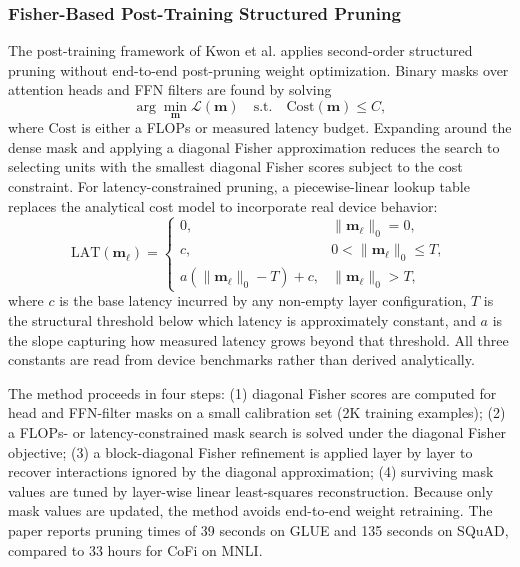 \methodsep

\subsubsection{Fisher-Based Post-Training Structured Pruning}

The post-training framework of Kwon et al. \cite{kwon2022fast} applies second-order structured pruning without end-to-end post-pruning weight optimization. Binary masks over attention heads and FFN filters are found by solving
\begin{equation}
	\arg\min_{\mathbf{m}} \mathcal{L}(\mathbf{m})
	\quad \text{s.t.} \quad
	\mathrm{Cost}(\mathbf{m}) \leq C,
\end{equation}
where $\mathrm{Cost}$ is either a FLOPs or measured latency budget. Expanding around the dense mask and applying a diagonal Fisher approximation reduces the search to selecting units with the smallest diagonal Fisher scores subject to the cost constraint. For latency-constrained pruning, a piecewise-linear lookup table replaces the analytical cost model to incorporate real device behavior:
\begin{equation}
	\mathrm{LAT}(\mathbf{m}_{\ell}) =
	\begin{cases}
		0, & \|\mathbf{m}_{\ell}\|_0 = 0, \\
		c, & 0 < \|\mathbf{m}_{\ell}\|_0 \leq T, \\
		a(\|\mathbf{m}_{\ell}\|_0 - T) + c, & \|\mathbf{m}_{\ell}\|_0 > T,
	\end{cases}
\end{equation}
where $c$ is the base latency incurred by any non-empty layer configuration, $T$ is the structural threshold below which latency is approximately constant, and $a$ is the slope capturing how measured latency grows beyond that threshold. All three constants are read from device benchmarks rather than derived analytically.

The method proceeds in four steps: (1) diagonal Fisher scores are computed for head and FFN-filter masks on a small calibration set (2K training examples); (2) a FLOPs- or latency-constrained mask search is solved under the diagonal Fisher objective; (3) a block-diagonal Fisher refinement is applied layer by layer to recover interactions ignored by the diagonal approximation; (4) surviving mask values are tuned by layer-wise linear least-squares reconstruction. Because only mask values are updated, the method avoids end-to-end weight retraining. The paper reports pruning times of 39 seconds on GLUE and 135 seconds on SQuAD, compared to 33 hours for CoFi on MNLI.

